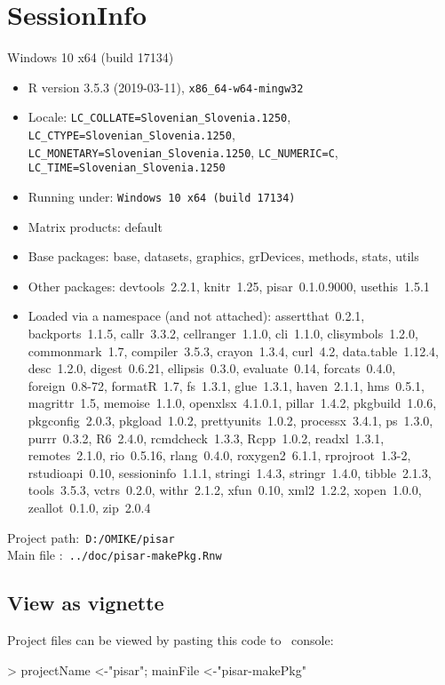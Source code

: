 \documentclass[a4paper,12pt]{article}\usepackage[]{graphicx}\usepackage[]{color}
\begin{document}
%

\clearpage
\section*{SessionInfo}
{\small
Windows 10 x64 (build 17134) 
\begin{itemize}\raggedright
  \item R version 3.5.3 (2019-03-11), \verb|x86_64-w64-mingw32|
  \item Locale: \verb|LC_COLLATE=Slovenian_Slovenia.1250|, \verb|LC_CTYPE=Slovenian_Slovenia.1250|, \verb|LC_MONETARY=Slovenian_Slovenia.1250|, \verb|LC_NUMERIC=C|, \verb|LC_TIME=Slovenian_Slovenia.1250|
  \item Running under: \verb|Windows 10 x64 (build 17134)|
  \item Matrix products: default
  \item Base packages: base, datasets, graphics, grDevices,
    methods, stats, utils
  \item Other packages: devtools~2.2.1, knitr~1.25,
    pisar~0.1.0.9000, usethis~1.5.1
  \item Loaded via a namespace (and not attached):
    assertthat~0.2.1, backports~1.1.5, callr~3.3.2,
    cellranger~1.1.0, cli~1.1.0, clisymbols~1.2.0,
    commonmark~1.7, compiler~3.5.3, crayon~1.3.4, curl~4.2,
    data.table~1.12.4, desc~1.2.0, digest~0.6.21,
    ellipsis~0.3.0, evaluate~0.14, forcats~0.4.0,
    foreign~0.8-72, formatR~1.7, fs~1.3.1, glue~1.3.1,
    haven~2.1.1, hms~0.5.1, magrittr~1.5, memoise~1.1.0,
    openxlsx~4.1.0.1, pillar~1.4.2, pkgbuild~1.0.6,
    pkgconfig~2.0.3, pkgload~1.0.2, prettyunits~1.0.2,
    processx~3.4.1, ps~1.3.0, purrr~0.3.2, R6~2.4.0,
    rcmdcheck~1.3.3, Rcpp~1.0.2, readxl~1.3.1, remotes~2.1.0,
    rio~0.5.16, rlang~0.4.0, roxygen2~6.1.1, rprojroot~1.3-2,
    rstudioapi~0.10, sessioninfo~1.1.1, stringi~1.4.3,
    stringr~1.4.0, tibble~2.1.3, tools~3.5.3, vctrs~0.2.0,
    withr~2.1.2, xfun~0.10, xml2~1.2.2, xopen~1.0.0,
    zeallot~0.1.0, zip~2.0.4
\end{itemize}
Project path:\verb' D:/OMIKE/pisar '\\
Main file :\verb' ../doc/pisar-makePkg.Rnw '


\subsection*{View as vignette}
Project files can be viewed by pasting this code to \R\ console:\\
\begin{Schunk}
\begin{Sinput}
> projectName <-"pisar";  mainFile <-"pisar-makePkg"


\end{Sinput}
\end{Schunk}}
\end{document}
